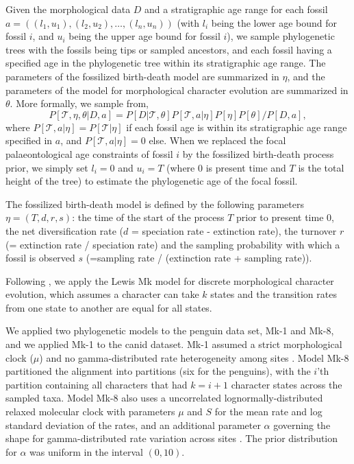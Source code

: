 \documentclass[11pt]{article}
\newcommand{\Mstrict}{{Mk-1}}
\newcommand{\Mrelaxed}{{Mk-8}}
\begin{document}
Given the morphological data $D$ and a stratigraphic age range for each fossil $a = ((l_1,u_1),(l_2, u_2),\ldots,(l_n,u_n))$ (with $l_i$ being the lower age bound for fossil $i$, and $u_i$ being the upper age bound for fossil $i$), we sample phylogenetic trees with the fossils being tips or sampled ancestors, and each fossil having a specified age  in the phylogenetic tree within its stratigraphic age range. The parameters of the fossilized birth-death model are summarized in $\eta$, and the parameters  of the model for morphological character evolution are summarized in $\theta$. More formally, we sample from,
$$P[\mathcal{T},\eta, \theta | D, a] = P[D|\mathcal{T},\theta] P[\mathcal{T},a|\eta] P[\eta] P[\theta]/P[D,a],$$
where $ P[\mathcal{T},a|\eta] =  P[\mathcal{T}|\eta] $ if each fossil age is within its stratigraphic age range specified in $a$, and $ P[\mathcal{T},a|\eta] =0$ else.
When we replaced the focal  palaeontological age constraints of fossil $i$  by 
the fossilized birth-death process prior, we simply set $l_i=0$ and $u_i=T$ (where 0 is present time and $T$ is the total height of the tree) to estimate the phylogenetic age of the focal fossil.

The fossilized birth-death model is defined by the following parameters $\eta=(T,d,r,s)$:  the time of the start of the process $T$ prior to present time 0, the net diversification rate ($d$ = speciation rate - extinction rate), the turnover $r$ (= extinction rate / speciation rate) and the sampling probability with which a fossil is observed $s$ (=sampling rate / (extinction rate + sampling rate)).
  
Following \cite{gavryushkina2015bayesian}, we apply the Lewis Mk model 
\cite{Lewis2001} for discrete morphological character evolution, which assumes a character can take $k$ states and the transition rates from one state to another are equal for all states. 

We applied two phylogenetic models to the penguin data set, \Mstrict{} and \Mrelaxed{}, and we applied \Mstrict{} to the canid dataset. \Mstrict{} assumed a strict morphological clock ($\mu$) and no gamma-distributed rate heterogeneity among sites  \cite{Lewis2001}. 
Model \Mrelaxed{} \citep{gavryushkina2015bayesian} partitioned the alignment into  partitions (six for the penguins), with the $i$'th partition containing all characters that had $k=i+1$ character states across the sampled taxa. 
Model \Mrelaxed{} also uses a uncorrelated lognormally-distributed relaxed molecular clock \cite{Drummond2006} with parameters $\mu$ and $S$ for the mean rate and log standard deviation of the rates, and an additional parameter $\alpha$ governing the shape for gamma-distributed rate variation across sites \cite{yang:1994ma}. 
The prior distribution for $\alpha$ was uniform in the interval $(0,10)$. 
\end{document}
